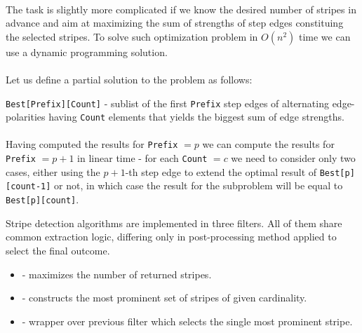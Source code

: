 \paragraph*{}
The task is slightly more complicated if we know the desired number of stripes in advance and aim at maximizing the sum of strengths of step edges constituing the selected stripes. To solve such optimization problem in $O(n^2)$ time we can use a dynamic programming solution.

\paragraph*{}
Let us define a partial solution to the problem as follows:
\begin{description}
	\item \texttt{Best[Prefix][Count]} - sublist of the first \texttt{Prefix} step edges of alternating edge-polarities having \texttt{Count} elements that yields the biggest sum of edge strengths.
\end{description}

\paragraph*{}
Having computed the results for \texttt{Prefix} $=p$ we can compute the results for \texttt{Prefix} $=p+1$ in linear time - for each \texttt{Count} $=c$ we need to consider only two cases, either using the $p+1$-th step edge to extend the optimal result of \texttt{Best[p][count-1]} or not, in which case the result for the subproblem will be equal to \texttt{Best[p][count]}.

\begin{refImpl}
Stripe detection algorithms are implemented in three \studio filters. All of them share common extraction logic, differing only in post-processing method applied to select the final outcome.
\begin{itemize}
	\item {} - maximizes the number of returned stripes.
	\item {} - constructs the most prominent set of stripes of given cardinality.
	\item {} - wrapper over previous filter which selects the single most prominent stripe.
\end{itemize} 
\end{refImpl}